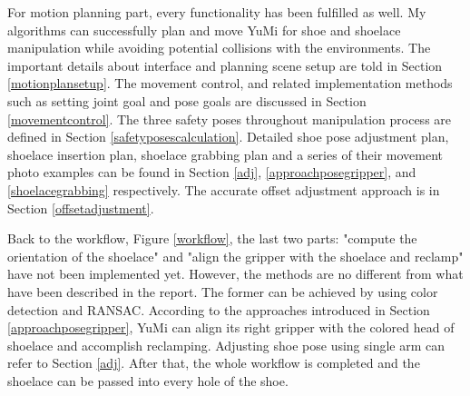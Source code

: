 For motion planning part, every functionality has been fulfilled as well. My algorithms can successfully plan and move YuMi for shoe and shoelace manipulation while avoiding potential collisions with the environments. The important details about interface and planning scene setup are told in Section \ref{motionplansetup}. The movement control, and related implementation methods such as setting joint goal and pose goals are discussed in Section \ref{movementcontrol}. The three safety poses throughout manipulation process are defined in Section \ref{safetyposescalculation}. Detailed shoe pose adjustment plan, shoelace insertion plan, shoelace grabbing plan and a series of their movement photo examples can be found in Section \ref{adj}, \ref{approachposegripper}, and \ref{shoelacegrabbing} respectively. The accurate offset adjustment approach is in Section \ref{offsetadjustment}.


Back to the workflow, Figure \ref{workflow}, the last two parts: "compute the orientation of the shoelace" and "align the gripper with the shoelace and reclamp" have not been implemented yet. However, the methods are no different from what have been described in the report. The former can be achieved by using color detection and RANSAC. According to the approaches introduced in Section \ref{approachposegripper}, YuMi can align its right gripper with the colored head of shoelace and accomplish reclamping. Adjusting shoe pose using single arm can refer to Section \ref{adj}. After that, the whole workflow is completed and the shoelace can be passed into every hole of the shoe.






